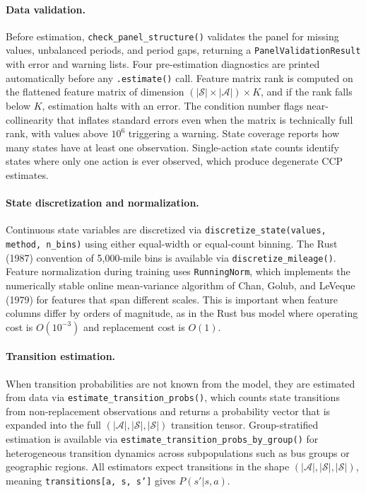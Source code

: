\paragraph{Data validation.}
Before estimation, \texttt{check\_panel\_structure()} validates the panel for missing values, unbalanced periods, and period gaps, returning a \texttt{PanelValidationResult} with error and warning lists.
Four pre-estimation diagnostics are printed automatically before any \texttt{.estimate()} call.
Feature matrix rank is computed on the flattened feature matrix of dimension $(|\mathcal{S}| \times |\mathcal{A}|) \times K$, and if the rank falls below $K$, estimation halts with an error.
The condition number flags near-collinearity that inflates standard errors even when the matrix is technically full rank, with values above $10^6$ triggering a warning.
State coverage reports how many states have at least one observation.
Single-action state counts identify states where only one action is ever observed, which produce degenerate CCP estimates.

\paragraph{State discretization and normalization.}
Continuous state variables are discretized via \texttt{discretize\_state(values, method, n\_bins)} using either equal-width or equal-count binning.
The Rust (1987) convention of 5{,}000-mile bins is available via \texttt{discretize\_mileage()}.
Feature normalization during training uses \texttt{RunningNorm}, which implements the numerically stable online mean-variance algorithm of Chan, Golub, and LeVeque (1979) for features that span different scales.
This is important when feature columns differ by orders of magnitude, as in the Rust bus model where operating cost is $O(10^{-3})$ and replacement cost is $O(1)$.

\paragraph{Transition estimation.}
When transition probabilities are not known from the model, they are estimated from data via \texttt{estimate\_transition\_probs()}, which counts state transitions from non-replacement observations and returns a probability vector that is expanded into the full $(|\mathcal{A}|, |\mathcal{S}|, |\mathcal{S}|)$ transition tensor.
Group-stratified estimation is available via \texttt{estimate\_transition\_probs\_by\_group()} for heterogeneous transition dynamics across subpopulations such as bus groups or geographic regions.
All estimators expect transitions in the shape $(|\mathcal{A}|, |\mathcal{S}|, |\mathcal{S}|)$, meaning \texttt{transitions[a, s, s']} gives $P(s'|s,a)$.

